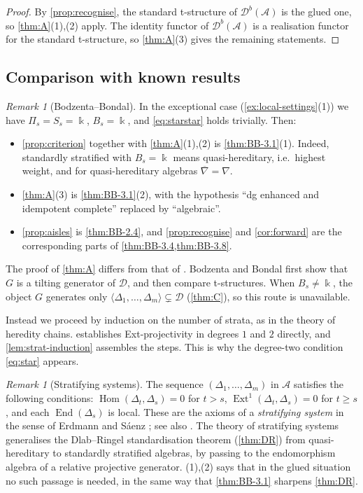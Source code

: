 \documentclass[11pt,reqno]{amsart}
\theoremstyle{plain}
\theoremstyle{definition}
\theoremstyle{remark}
\newtheorem{remark}[theorem]{Remark}
\newcommand{\kk}{\Bbbk}
\DeclareMathOperator{\Hom}{Hom}
\DeclareMathOperator{\End}{End}
\DeclareMathOperator{\Ext}{Ext}
\newcommand{\Db}{\mathcal{D}^b}
\newcommand{\thick}[1]{\langle #1\rangle}
\newcommand{\nablabar}{\overline{\nabla}}
\newcommand{\cD}{\mathcal{D}}
\newcommand{\cA}{\mathcal{A}}
\begin{document}
\begin{proof}
By \cref{prop:recognise}, the standard t-structure of $\Db(\cA)$ is the glued one, so \cref{thm:A}(1),(2) apply. The identity functor of $\Db(\cA)$ is a realisation functor for the standard t-structure, so \cref{thm:A}(3) gives the remaining statements.
\end{proof}

\subsection{Comparison with known results}

\begin{remark}[Bodzenta--Bondal]\label{rem:compare-BB}
In the exceptional case (\cref{ex:local-settings}(1)) we have $\Pi_s=S_s=\kk$, $B_s=\kk$, and \eqref{eq:starstar} holds trivially. Then:
\begin{itemize}
\item \cref{prop:criterion} together with \cref{thm:A}(1),(2) is \cref{thm:BB-3.1}(1). Indeed, standardly stratified with $B_s=\kk$ means quasi-hereditary, i.e.\ highest weight, and for quasi-hereditary algebras $\nablabar=\nabla$.
\item \cref{thm:A}(3) is \cref{thm:BB-3.1}(2), with the hypothesis ``dg enhanced and idempotent complete'' replaced by ``algebraic''.
\item \cref{prop:aisles} is \cref{thm:BB-2.4}, and \cref{prop:recognise} and \cref{cor:forward} are the corresponding parts of \cref{thm:BB-3.4,thm:BB-3.8}.
\end{itemize}
The proof of \cref{thm:A} differs from that of \cite{BB26}. Bodzenta and Bondal first show that $G$ is a tilting generator of $\cD$, and then compare t-structures. When $B_s\neq\kk$, the object $G$ generates only $\thick{\Delta_1,\dots,\Delta_m}\subsetneq\cD$ (\cref{thm:C}), so this route is unavailable.

Instead we proceed by induction on the number of strata, as in the theory of heredity chains.  establishes Ext-projectivity in degrees $1$ and $2$ directly, and \cref{lem:strat-induction} assembles the steps. This is why the degree-two condition \eqref{eq:star} appears.
\end{remark}

\begin{remark}[Stratifying systems]
The sequence $(\Delta_1,\dots,\Delta_m)$ in $\cA$ satisfies the following conditions: $\Hom(\Delta_t,\Delta_s)=0$ for $t>s$, $\Ext^1(\Delta_t,\Delta_s)=0$ for $t\ge s$, and each $\End(\Delta_s)$ is local. These are the axioms of a \emph{stratifying system} in the sense of Erdmann and S\'aenz \cite{ES03}; see also \cite{MMS04}. The theory of stratifying systems generalises the Dlab--Ringel standardisation theorem (\cref{thm:DR}) from quasi-hereditary to standardly stratified algebras, by passing to the endomorphism algebra of a relative projective generator. (1),(2) says that in the glued situation no such passage is needed, in the same way that \cref{thm:BB-3.1} sharpens \cref{thm:DR}.
\end{remark}
\end{document}
